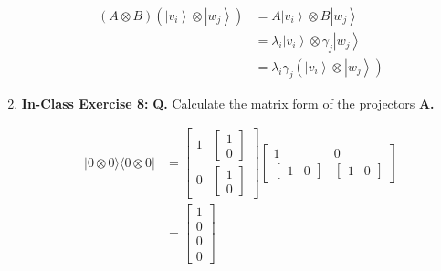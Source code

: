 \documentclass[main.tex]{subfiles}
\begin{document}
\begin{enumerate}
    \begin{align*}
        (A \otimes B)\left(\left|v_{i}\right\rangle 
        \otimes\left|w_{j}\right\rangle\right)      & = A\left|v_{i}\right\rangle 
                                                    \otimes B\left|w_{j}\right\rangle \\
                                                    & = \lambda_{i}\left|v_{i}\right\rangle 
                                                    \otimes \gamma_{j}\left|w_{j}\right\rangle \\
                                                    & = \lambda_{i} \gamma_{j}\left(\left|v_{i}\right\rangle 
                                                    \otimes \left|w_{j}\right\rangle\right)
    \end{align*}
    

\item[] \textbf{In-Class Exercise 8:} \textbf{Q.} Calculate the matrix form of the projectors \textbf{A.}
    \begin{enumerate}
        \begin{align*}
            |0 \otimes 0\rangle\langle 0 \otimes 0| & = \left[\begin{array}{ll} 1 & {\left[\begin{array}{l} 1 \\ 0 \end{array}\right]} \\
                                                    0 & {\left[\begin{array}{l} 1 \\ 0 \end{array}\right]} \end{array}\right]
                                                    \left[\begin{array}{ll} 1 & 0 \\
                                                    {\left[\begin{array}{ll} 1 & 0 \end{array}\right]} & 
                                                    {\left[\begin{array}{ll} 1 & 0 \end{array}\right]} \end{array}\right]\\
                                                    & = \left[\begin{array}{l} 1 \\ 0 \\ 0 \\ 0 \end{array}\right]

\end{align*}
\end{enumerate}
\end{enumerate}
\end{document}
